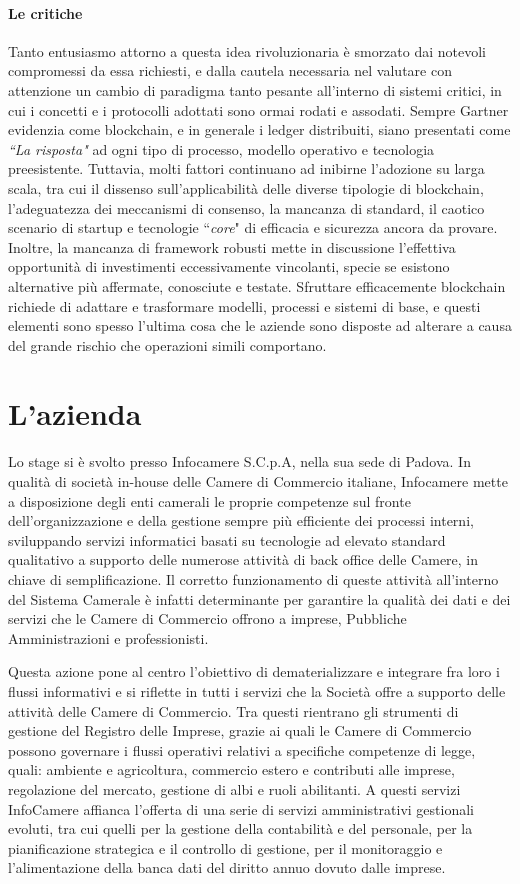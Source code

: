 	\paragraph{Le critiche} Tanto entusiasmo attorno a questa idea rivoluzionaria è smorzato dai notevoli compromessi da essa richiesti, e dalla cautela necessaria nel valutare con attenzione un cambio di paradigma tanto pesante all'interno di sistemi critici, in cui i concetti e i protocolli adottati sono ormai rodati e assodati. Sempre Gartner evidenzia come blockchain, e in generale i ledger distribuiti, siano presentati come \emph{``La risposta"} ad ogni tipo di processo, modello operativo e tecnologia preesistente. Tuttavia, molti fattori continuano ad inibirne l'adozione su larga scala, tra cui il dissenso sull'applicabilità delle diverse tipologie di blockchain, l'adeguatezza dei meccanismi di consenso, la mancanza di standard, il caotico scenario di startup e tecnologie ``\emph{core}" di efficacia e sicurezza ancora da provare. Inoltre, la mancanza di framework robusti mette in discussione l'effettiva opportunità di investimenti eccessivamente vincolanti, specie se esistono alternative più affermate, conosciute e testate. Sfruttare efficacemente blockchain richiede di adattare e trasformare modelli, processi e sistemi di base, e questi elementi sono spesso l'ultima cosa che le aziende sono disposte ad alterare a causa del grande rischio che operazioni simili comportano.

\section{L'azienda}
	Lo stage si è svolto presso Infocamere S.C.p.A, nella sua sede di Padova.
	In qualità di società in-house delle Camere di Commercio italiane, Infocamere mette a disposizione degli enti camerali le proprie competenze sul fronte dell’organizzazione e della gestione sempre più efficiente dei processi interni, sviluppando servizi informatici basati su tecnologie ad elevato standard qualitativo a supporto delle numerose attività di back office delle Camere, in chiave di semplificazione. Il corretto funzionamento di queste attività all'interno del Sistema Camerale è infatti determinante per garantire la qualità dei dati e dei servizi che le Camere di Commercio offrono a imprese, Pubbliche Amministrazioni e professionisti.
	
	Questa azione pone al centro l’obiettivo di dematerializzare e integrare fra loro i flussi informativi e si riflette in tutti i servizi che la Società offre a supporto delle attività delle Camere di Commercio. Tra questi rientrano gli strumenti di gestione del Registro delle Imprese, grazie ai quali le Camere di Commercio possono governare i flussi operativi relativi a specifiche competenze di legge, quali: ambiente e agricoltura, commercio estero e contributi alle imprese, regolazione del mercato, gestione di albi e ruoli abilitanti. A questi servizi InfoCamere affianca l’offerta di una serie di servizi amministrativi gestionali evoluti, tra cui quelli per la gestione della contabilità e del personale, per la pianificazione strategica e il controllo di gestione, per il monitoraggio e l'alimentazione della banca dati del diritto annuo dovuto dalle imprese.

